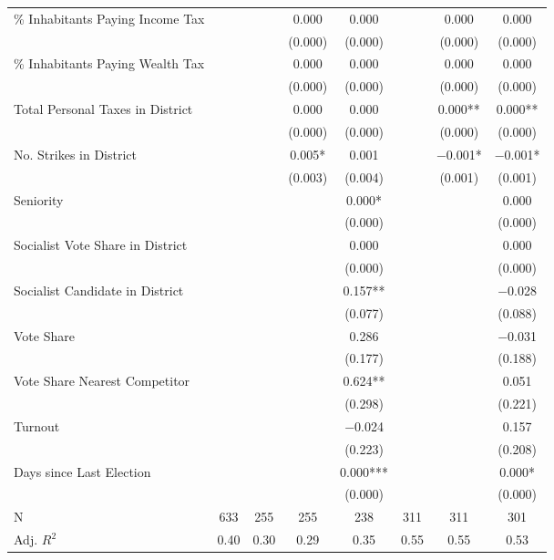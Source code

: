 \begin{table}[!h]
{\begin{threeparttable}
\begin{tabular}[t]{lccccccc}
\% Inhabitants Paying Income Tax &  &  & \num{0.000} & \num{0.000} &  & \num{0.000} & \num{0.000}\\
 &  &  & (\num{0.000}) & (\num{0.000}) &  & (\num{0.000}) & \vphantom{2} (\num{0.000})\\
\% Inhabitants Paying Wealth Tax &  &  & \num{0.000} & \num{0.000} &  & \num{0.000} & \num{0.000}\\
 &  &  & (\num{0.000}) & (\num{0.000}) &  & (\num{0.000}) & \vphantom{1} (\num{0.000})\\
Total Personal Taxes in District &  &  & \num{0.000} & \num{0.000} &  & \num{0.000}** & \num{0.000}**\\
 &  &  & (\num{0.000}) & (\num{0.000}) &  & (\num{0.000}) & (\num{0.000})\\
No. Strikes in District &  &  & \num{0.005}* & \num{0.001} &  & \num{-0.001}* & \num{-0.001}*\\
 &  &  & (\num{0.003}) & (\num{0.004}) &  & (\num{0.001}) & (\num{0.001})\\
Seniority &  &  &  & \num{0.000}* &  &  & \num{0.000}\\
 &  &  &  & (\num{0.000}) &  &  & \vphantom{2} (\num{0.000})\\
Socialist Vote Share in District &  &  &  & \num{0.000} &  &  & \num{0.000}\\
 &  &  &  & (\num{0.000}) &  &  & \vphantom{1} (\num{0.000})\\
Socialist Candidate in District &  &  &  & \num{0.157}** &  &  & \num{-0.028}\\
 &  &  &  & (\num{0.077}) &  &  & (\num{0.088})\\
Vote Share &  &  &  & \num{0.286} &  &  & \num{-0.031}\\
 &  &  &  & (\num{0.177}) &  &  & (\num{0.188})\\
Vote Share Nearest Competitor &  &  &  & \num{0.624}** &  &  & \num{0.051}\\
 &  &  &  & (\num{0.298}) &  &  & (\num{0.221})\\
Turnout &  &  &  & \num{-0.024} &  &  & \num{0.157}\\
 &  &  &  & (\num{0.223}) &  &  & (\num{0.208})\\
Days since Last Election &  &  &  & \num{0.000}*** &  &  & \num{0.000}*\\
 &  &  &  & (\num{0.000}) &  &  & (\num{0.000})\\
\midrule
N & \num{633} & \num{255} & \num{255} & \num{238} & \num{311} & \num{311} & \num{301}\\
Adj. $R^2$ & \num{0.40} & \num{0.30} & \num{0.29} & \num{0.35} & \num{0.55} & \num{0.55} & \num{0.53}\\

\end{tabular}
\end{threeparttable}}
\end{table}
